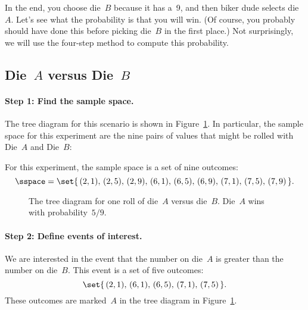 In the end, you choose die~$B$ because it has a~9, and then biker dude
selects die~$A$.  Let's see what the probability is that you will win.
(Of course, you probably should have done this before picking die~$B$
in the first place.)  Not surprisingly, we will use the four-step
method to compute this probability.

\subsection{Die~$A$ versus Die~$B$}

\paragraph{Step 1: Find the sample space.}

The tree diagram for this scenario is shown in Figure~\ref{fig:14A8}.
In particular, the sample space for this experiment are the nine pairs
of values that might be rolled with Die~$A$ and Die~$B$:

For this experiment, the sample space is a set of nine outcomes:
\begin{equation*}
\sspace = \set{\, (2, 1), \, (2, 5), \, (2, 9), \,
                  (6, 1), \, (6, 5), \, (6, 9), \,
                  (7, 1), \, (7, 5), \, (7, 9) \,}.
\end{equation*}


\iffalse
\footnote{Actually, the whole
  probability space is worked out in this one picture.  But pretend
  that each component sort of fades in---nyyrrroom!---as you read
  about the corresponding step below.}\fi

\begin{figure}


\caption{The tree diagram for one roll of die~$A$ versus die~$B$.
  Die~$A$ wins with probability~$5/9$.}

\label{fig:14A8}

\end{figure}


\paragraph{Step 2: Define events of interest.}

We are interested in the event that the number on die~$A$ is greater
than the number on die~$B$.  This event is a set of five outcomes:
\begin{equation*}
    \set{\, (2, 1), \, (6, 1), \, (6, 5), \, (7, 1), \, (7, 5) \,}.
\end{equation*}
These outcomes are marked~$A$ in the tree diagram in
Figure~\ref{fig:14A8}.

